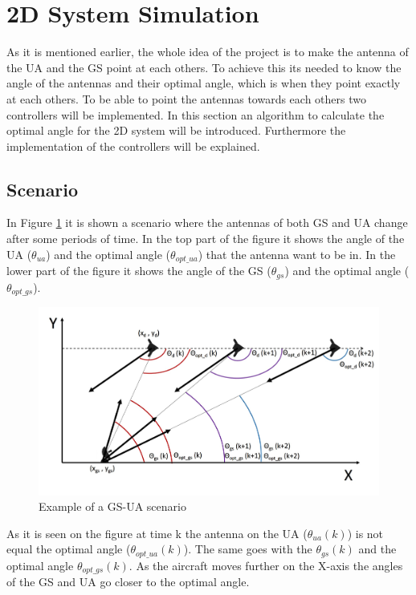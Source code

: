 \newpage
\section{2D System Simulation}\label{sec:2d_sim}
As it is mentioned earlier, the whole idea of the project is to make the antenna of the UA and the GS point at each others. To achieve this its needed to know the angle of the antennas and their optimal angle, which is when they point exactly at each others. To be able to point the antennas towards each others two controllers will be implemented. In this section an algorithm to calculate the optimal angle for the 2D system will be introduced. Furthermore the implementation of the controllers will be explained.

\subsection{Scenario}
In Figure \ref{fig:ua_gs} it is shown a scenario where the antennas of both GS and UA change after some periods of time. In the top part of the figure it shows the angle of the UA ($\theta_{ua}$) and the optimal angle ($\theta_{opt\_ua}$) that the antenna want to be in. In the lower part of the figure it shows the angle of the GS ($\theta_{gs}$) and the optimal angle ($\theta_{opt\_gs}$). 

\begin{figure}[h]
	\centering
	
	\includegraphics[scale=0.45]{figures/drone_gs_ex_1.jpg}
	\caption{Example of a GS-UA scenario}
	\label{fig:ua_gs}
\end{figure}

As it is seen on the figure at time k the antenna on the UA ($\theta_{ua} (k)$) is not equal the optimal angle ($\theta_{opt\_ua}(k)$). The same goes with the $\theta_{gs}(k)$ and the optimal angle $\theta_{opt\_gs}(k)$. As the aircraft moves further on the X-axis the angles of the GS and UA go closer to the optimal angle. 

